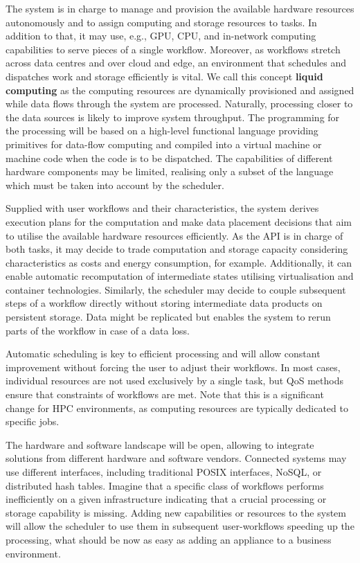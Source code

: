 \documentclass[a4paper]{article}
\begin{document}
{{\begin{description}
The system is in charge to manage and provision the available hardware resources autonomously and to assign computing and storage resources to tasks.
In addition to that, it may use, e.g., GPU, CPU, and in-network computing capabilities to serve pieces of a single workflow.
Moreover, as workflows stretch across data centres and over cloud and edge, an environment that schedules and dispatches work and storage efficiently is vital.
We call this concept \textbf{liquid computing} as the computing resources are dynamically provisioned and assigned while data flows through the system are processed.
Naturally, processing closer to the data sources is likely to improve system throughput.
The programming for the processing will be based on a high-level functional language providing primitives for data-flow computing and compiled into a virtual machine or machine code when the code is to be dispatched.
The capabilities of different hardware components may be limited, realising only a subset of the language which must be taken into account by the scheduler.

\item[Smart Scheduling]

Supplied with user workflows and their characteristics, the system derives execution plans for the computation and make data placement decisions that aim to utilise the available hardware resources efficiently.
As the API is in charge of both tasks, it may decide to trade computation and storage capacity considering characteristics as costs and energy consumption, for example. Additionally, it can enable automatic recomputation of intermediate states utilising virtualisation and container technologies.
Similarly, the scheduler may decide to couple subsequent steps of a workflow directly without storing intermediate data products on persistent storage.
Data might be replicated but enables the system to rerun parts of the workflow in case of a data loss.

Automatic scheduling is key to efficient processing and will allow constant improvement without forcing the user to adjust their workflows.
In most cases, individual resources are not used exclusively by a single task, but QoS methods ensure that constraints of workflows are met.
Note that this is a significant change for HPC environments, as computing resources are typically dedicated to specific jobs.

\item[Extensible Ecosystem]

The hardware and software landscape will be open, allowing to integrate solutions from different hardware and software vendors.
Connected systems may use different interfaces, including traditional POSIX interfaces, NoSQL, or distributed hash tables.
Imagine that a specific class of workflows performs inefficiently on a given infrastructure indicating that a crucial processing or storage capability is missing.
Adding new capabilities or resources to the system will allow the scheduler to use them in subsequent user-workflows speeding up the processing, what should be now as easy as adding an appliance to a business environment.


\end{description}}}
\end{document}
